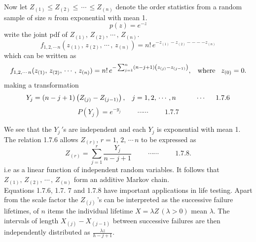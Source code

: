 \documentclass[12pt,a4paper]{report}
\theoremstyle{definition}
\theoremstyle{plain}
\begin{document}
Now let $Z_{(1)} \leq Z_{(2)} \leq \, \cdots\, \leq Z_{(n)}$ denote the order statistics from a random sample of size $n$ from exponential with mean 1. $$p(z) = e^{-z}$$
write the joint pdf of $Z_{(1)}, \, Z_{(2)}, \, \cdots\, , \, Z_{(n)}$.
$$f_{1,2, \cdots\, n}(z_{(1)},\, z_{(2)}, \, \cdots\, , \, z_{(n)}) = n!\, e^{-z_{(1)} - z_{(2)} - --- z_{(n)}}$$
which can be written as 
$$f_{1,2, \cdots\, n}(z_{(1)},\, z_{(2)}, \, \cdots\, , \, z_{(n)}) = n!\, e^{-\sum^n_{j = 1} \left(n - j + 1\right)\left(z_{(j)} - z_{(j - 1)}\right)}, \hspace{0.3cm}\text{where}\hspace{0.3cm} z_{(0)} = 0.$$
making a transformation
$$Y_j = \left(n - j + 1\right)\left(Z_{(j)} - Z_{(j - 1)}\right),\hspace{0.3cm} j = 1, 2,\, \cdots\, , n\hspace{1cm}\cdots\hspace{0.5cm} 1.7.6$$
$$P(Y_j) = e^{-y_j}\hspace{1cm} \cdots\cdots\hspace{1cm} 1.7.7$$

We see that the $Y_j\, '$s are independent and each $Y_j$ is exponential with mean 1.\\
The relation 1.7.6 allows  $Z_{(r)}, \, r = 1, \, 2, \, \cdots\, n$ to be expressed as 
$$Z_{(r)} = \sum^r_{j = 1} \frac{Y_j}{n - j + 1}\hspace{1cm} \cdots\cdots\hspace{1cm} 1.7.8.$$
i.e as a linear function of independent random variables. It follows that $Z_{(1)}, \, Z_{(2)}, \, \cdots\, , \, Z_{(n)}$ form an additive Markov chain.\\
Equations 1.7.6, 1.7. 7 and 1.7.8 have important applications in life testing. Apart from the scale factor the $Z_{(j)}\,$'s can be interpreted as the successive failure lifetimes, of $n$ items the individual lifetime $X = \lambda Z\, (\lambda > 0)$ mean $\lambda$. The intervals of length $X_{(j)} - X_{(j - 1)}$ between successive failures are then independently distributed as $\frac{\lambda z}{ h - j + 1}$.
\end{document}
